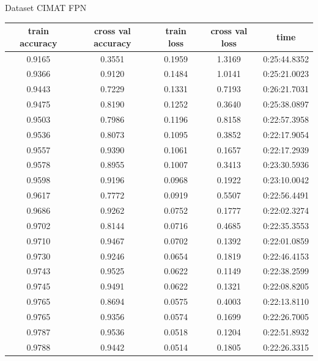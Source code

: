 \begin{frame}{Dataset CIMAT}
    \tiny
    FPN
    \centering
    \begin{tabular}{c|c|c|c|c}
         \hline        train accuracy&cross val accuracy&train loss&cross val loss&time\\
         \hline
0.9165&0.3551&0.1959&1.3169&0:25:44.8352\\
0.9366&0.9120&0.1484&1.0141&0:25:21.0023\\
0.9443&0.7229&0.1331&0.7193&0:26:21.7031\\
0.9475&0.8190&0.1252&0.3640&0:25:38.0897\\
0.9503&0.7986&0.1196&0.8158&0:22:57.3958\\
0.9536&0.8073&0.1095&0.3852&0:22:17.9054\\
0.9557&0.9390&0.1061&0.1657&0:22:17.2939\\
0.9578&0.8955&0.1007&0.3413&0:23:30.5936\\
0.9598&0.9196&0.0968&0.1922&0:23:10.0042\\
0.9617&0.7772&0.0919&0.5507&0:22:56.4491\\
0.9686&0.9262&0.0752&0.1777&0:22:02.3274\\
0.9702&0.8144&0.0716&0.4685&0:22:35.3553\\
0.9710&0.9467&0.0702&0.1392&0:22:01.0859\\
0.9730&0.9246&0.0654&0.1819&0:22:46.4153\\
0.9743&0.9525&0.0622&0.1149&0:22:38.2599\\
0.9745&0.9491&0.0622&0.1321&0:22:08.8205\\
0.9765&0.8694&0.0575&0.4003&0:22:13.8110\\
0.9765&0.9356&0.0574&0.1699&0:22:26.7005\\
0.9787&0.9536&0.0518&0.1204&0:22:51.8932\\
0.9788&0.9442&0.0514&0.1805&0:22:26.3315\\
    \hline
    \end{tabular}
\end{frame}

